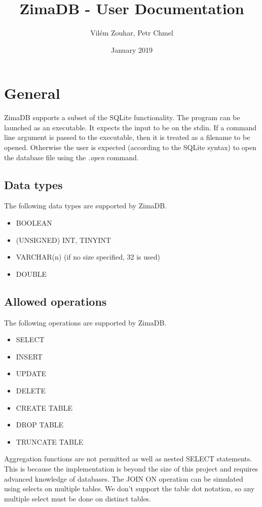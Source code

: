 \documentclass[a4paper]{article}
\title{\textbf{ZimaDB} - User Documentation}
\author{Vilém Zouhar, Petr Chmel}
\date{January 2019}
\begin{document}
\maketitle

\section{General}
ZimaDB supports a subset of the SQLite functionality. The program can be launched as an executable. It expects the input to be on the stdin. If a command line argument is passed to the executable, then it is treated as a filename to be opened. Otherwise the user is expected (according to the SQLite syntax) to open the database file using the \textit{.open} command.

\subsection{Data types}
The following data types are supported by ZimaDB.
\begin{itemize}
    \item BOOLEAN
    \item (UNSIGNED) INT, TINYINT
    \item VARCHAR(n) (if no size specified, 32 is used)
    \item DOUBLE
\end{itemize}

\subsection{Allowed operations}
The following operations are supported by ZimaDB.
\begin{itemize}
    \item SELECT
    \item INSERT
    \item UPDATE
    \item DELETE
    \item CREATE TABLE
    \item DROP TABLE
    \item TRUNCATE TABLE
\end{itemize}
Aggregation functions are not permitted as well as nested SELECT statements. This is because the implementation is beyond the size of this project and requires advanced knowledge of databases. The JOIN ON operation can be simulated using selects on multiple tables. We don't support the table dot notation, so any multiple select must be done on distinct tables. 
\end{document}
